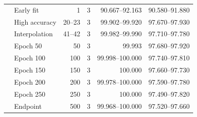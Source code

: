 \begin{table}[!htbp]
\begin{tabular}{llrrrr}
 & Early fit & 1 & 3 & 90.667--92.163 & 90.580--91.880\\
 & High accuracy & 20--23 & 3 & 99.902--99.920 & 97.670--97.930\\
 & Interpolation & 41--42 & 3 & 99.982--99.990 & 97.710--97.780\\
 & Epoch 50 & 50 & 3 & 99.993 & 97.680--97.920\\
 & Epoch 100 & 100 & 3 & 99.998--100.000 & 97.740--97.810\\
 & Epoch 150 & 150 & 3 & 100.000 & 97.660--97.730\\
 & Epoch 200 & 200 & 3 & 99.978--100.000 & 97.590--97.780\\
 & Epoch 250 & 250 & 3 & 100.000 & 97.490--97.820\\
 & Endpoint & 500 & 3 & 99.968--100.000 & 97.520--97.660\\
\bottomrule\end{tabular}\end{table}

